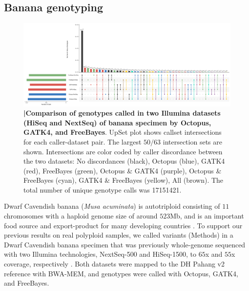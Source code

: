 \documentclass[notitlepage, twocolumn, 10pt]{article}
\begin{document}
\subsection*{Banana genotyping}

\begin{figure}[tp]
	\centering
    \includegraphics[width=\textwidth,height=0.4\textwidth]{figures/banana_intersections}
    \caption{\textbf{|\:Comparison of genotypes called in two Illumina datasets (HiSeq and NextSeq) of banana specimen by Octopus, GATK4, and FreeBayes}. UpSet plot shows callset intersections for each caller-dataset pair. The largest $50/63$ intersection sets are shown. Intersections are color coded by caller discordance between the two datasets: No discordances (black), Octopus (blue), GATK4 (red), FreeBayes (green), Octopus \& GATK4 (purple), Octopus \& FreeBayes (cyan), GATK4 \& FreeBayes (yellow), All (brown). The total number of unique genotype calls was \num[group-separator={,}]{17151421}.}
    \label{fig:banana_intersection}
\end{figure}

Dwarf Cavendish banana (\textit{Musa acuminata}) is autotriploid consisting of $11$ chromosomes with a haploid genome size of around $523$Mb, and is an important food source and export-product for many developing countries \cite{RN671}. To support our previous results on real polyploid samples, we called variants (Methods) in a Dwarf Cavendish banana specimen that was previously whole-genome sequenced with two Illumina technologies, NextSeq-500 and HiSeq-1500, to $65$x and $55$x coverage, respectively \cite{RN670}. Both datasets were mapped to the DH Pahang v2 reference \cite{RN671} with BWA-MEM, and genotypes were called with Octopus, GATK4, and FreeBayes.
\end{document}

